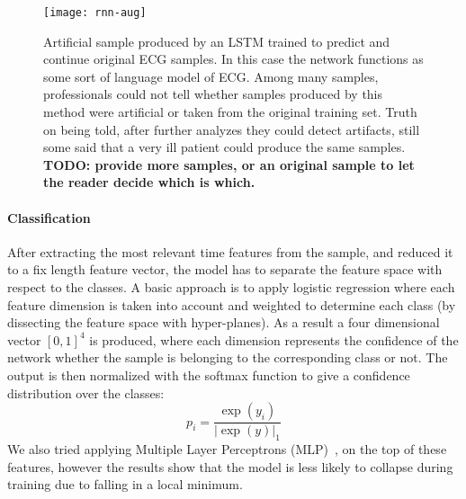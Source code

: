 \begin{figure}
  \centering
  \texttt{[image: rnn-aug]}\label{fig:rnn-aug}
  \caption{Artificial sample produced by an LSTM trained to predict and continue original ECG samples. In this case the network functions as some sort of language model of ECG. Among many samples, professionals could not tell whether samples produced by this method were artificial or taken from the original training set. Truth on being told, after further analyzes they could detect artifacts, still some said that a very ill patient could produce the same samples. \textbf{TODO: provide more samples, or an original sample to let the reader decide which is which.}}
\end{figure}

\paragraph{Classification}
After extracting the most relevant time features from the sample, and reduced it to a fix length feature vector, the model has to separate the feature space with respect to the classes.
A basic approach is to apply logistic regression where each feature dimension is taken into account and weighted to determine each class (by dissecting the feature space with hyper-planes).
As a result a four dimensional vector $[0, 1]^4$ is produced, where each dimension represents the confidence of the network whether the sample is belonging to the corresponding class or not. The output is then normalized with the softmax function to give a confidence distribution over the classes:
\begin{equation}
p_i = \frac{\exp(y_i)}{|\exp(y)|_1}
\end{equation}
We also tried applying Multiple Layer Perceptrons (MLP)~\cite{girshick2014rich}, on the top of these features, however the results show that the model is less likely to collapse during training due to falling in a local minimum.
